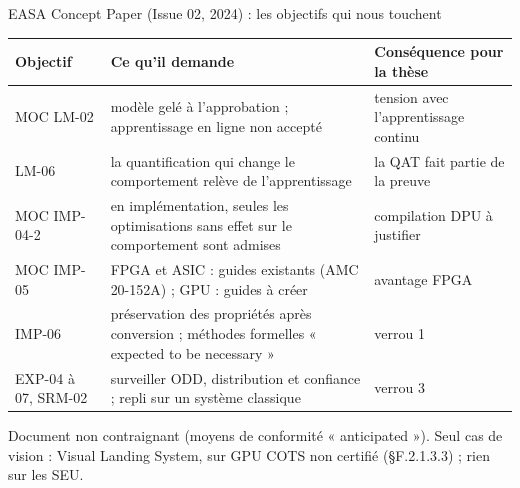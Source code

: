 \documentclass[aspectratio=169,11pt]{beamer}
\begin{document}
\begin{frame}{EASA Concept Paper (Issue 02, 2024) : les objectifs qui nous touchent}
  \footnotesize
  \begin{tabularx}{\textwidth}{@{}p{2.6cm} L p{3.6cm}@{}}
    \toprule
    Objectif & Ce qu'il demande & Conséquence pour la thèse \\
    \midrule
    MOC LM-02 & modèle gelé à l'approbation ; apprentissage en ligne non accepté &
      tension avec l'apprentissage continu \\
    LM-06 & la quantification qui change le comportement relève de l'apprentissage &
      la QAT fait partie de la preuve \\
    MOC IMP-04-2 & en implémentation, seules les optimisations sans effet sur le
      comportement sont admises & compilation DPU à justifier \\
    MOC IMP-05 & FPGA et ASIC : guides existants (AMC 20-152A) ; GPU : guides à créer &
      \alert{avantage FPGA} \\
    IMP-06 & préservation des propriétés après conversion ; méthodes formelles
      « expected to be necessary » & \alert{verrou 1} \\
    EXP-04 à 07, SRM-02 & surveiller ODD, distribution et confiance ; repli sur un système
      classique & \alert{verrou 3} \\
    \bottomrule
  \end{tabularx}

  \vspace{0.4em}
  \small
  Document non contraignant (moyens de conformité « anticipated »). Seul cas de vision :
  Visual Landing System, sur GPU COTS non certifié (§F.2.1.3.3) ; rien sur les SEU.
\end{frame}
\end{document}
